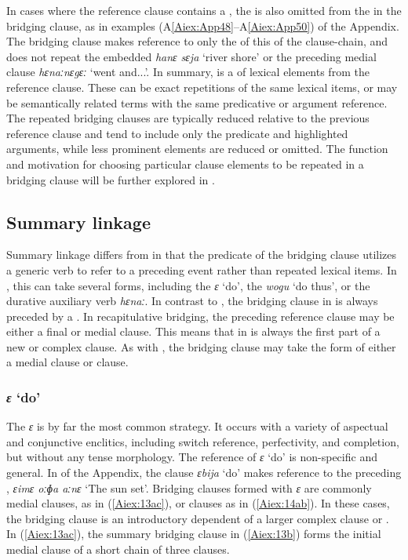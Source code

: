 \documentclass[output=paper]{LSP/langsci}
\begin{document}
In cases where the reference clause contains a , the  is also omitted from the  in the bridging clause, as in examples (A\ref{Aiex:App48}--A\ref{Aiex:App50}) of the Appendix. The bridging clause makes reference to only the  of this  of the clause-chain, and does not repeat the embedded  \textit{hanɛ sɛja} `river shore' or the preceding medial clause \textit{hɛnaːnɛgɛː} `went and...'. In summary,  is a  of lexical elements from the reference clause. These can be exact repetitions of the same lexical items, or may be semantically related terms with the same predicative or argument reference. The repeated bridging clauses are typically reduced relative to the previous reference clause and tend to include only the predicate and highlighted arguments, while less prominent elements are reduced or omitted. The function and motivation for choosing particular clause elements to be repeated in a bridging clause will be further explored in .


\subsection{Summary linkage} 
\label{AiSum.linkg}
Summary linkage differs from  in that the predicate of the bridging clause utilizes a generic verb to refer to a preceding event rather than repeated lexical items. In , this can take several forms, including the  \textit{ɛ} `do', the  \textit{wogu} `do thus', or the durative auxiliary verb \textit{hɛnaː}. In contrast to , the bridging clause in  is always preceded by a . In recapitulative bridging, the preceding reference clause may be either a final or medial clause. This means that  in  is always the first part of a new  or complex clause. As with , the bridging clause may take the form of either a medial clause or  clause.

\subsubsection{\textit{ɛ} `do'} 
\label{Ailightverb.do}
	The  \textit{ɛ} is by far the most common  strategy. It occurs with a variety of aspectual and conjunctive enclitics, including switch reference, perfectivity, and completion, but without any tense morphology. The reference of \textit{ɛ} `do' is non-specific and general. In  of the Appendix, the  clause \textit{ɛbija} ‘do’ makes reference to the preceding , \textit{ɛimɛ oːɸa aːnɛ} `The sun set'.
Bridging clauses formed with \textit{ɛ} are commonly medial clauses, as in (\ref{Aiex:13ac}), or  clauses as in
(\ref{Aiex:14ab}). In these cases, the bridging clause is an introductory dependent of a larger complex clause or . In (\ref{Aiex:13ac}), the summary bridging clause in (\ref{Aiex:13b}) forms the initial medial clause of a short chain of three clauses.
\end{document}
